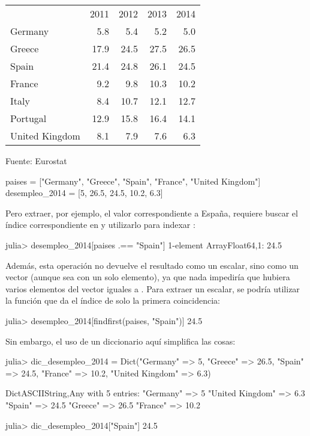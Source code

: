 \begin{tabular}{lrrrr}
& 2011 & 2012 & 2013 & 2014 \\
Germany & 5.8 & 5.4 & 5.2 & 5.0 \\
Greece & 17.9 & 24.5 & 27.5 & 26.5 \\
Spain & 21.4 & 24.8 & 26.1 & 24.5 \\
France & 9.2 & 9.8 & 10.3 & 10.2 \\
Italy & 8.4 & 10.7 & 12.1 & 12.7 \\
Portugal & 12.9 & 15.8 & 16.4 & 14.1 \\
United Kingdom & 8.1 & 7.9 & 7.6 & 6.3 \\
\end{tabular}

Fuente: Eurostat

\begin{juliacode}
paises = ["Germany", "Greece", "Spain", "France", "United Kingdom"]
desempleo_2014 = [5, 26.5, 24.5, 10.2, 6.3]
\end{juliacode}

Pero extraer, por ejemplo, el valor correspondiente a España, requiere buscar el índice correspondiente en  y utilizarlo para indexar :

\begin{jlconcode}
julia> desempleo_2014[paises .== "Spain"]
1-element Array{Float64,1}:
 24.5
\end{jlconcode}

Además, esta operación no devuelve el resultado como un escalar, sino como un vector (aunque sea con un solo elemento), ya que nada impediría que hubiera varios elementos del vector  iguales a . Para extraer un escalar, se podría utilizar la función  que da el índice de solo la primera coincidencia:

\begin{jlconcode}
julia> desempleo_2014[findfirst(paises, "Spain")]
24.5
\end{jlconcode}

Sin embargo, el uso de un diccionario aquí simplifica las cosas:

\begin{jlconcode}
julia> dic_desempleo_2014 = Dict("Germany" => 5,
          "Greece" => 26.5,
          "Spain" => 24.5,
          "France" => 10.2,
          "United Kingdom" => 6.3)

Dict{ASCIIString,Any} with 5 entries:
  "Germany"        => 5
  "United Kingdom" => 6.3
  "Spain"          => 24.5
  "Greece"         => 26.5
  "France"         => 10.2

julia> dic_desempleo_2014["Spain"]
24.5
\end{jlconcode}

